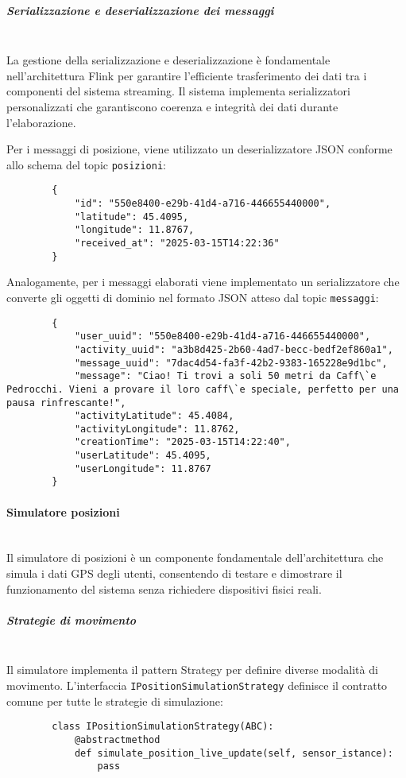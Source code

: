 \documentclass[10pt]{article}
\newcommand{\myparagraph}[1]{\paragraph{#1}\mbox{}\\}
\newcommand{\mysubparagraph}[1]{\subparagraph{#1}\mbox{}\\}
\begin{document}
        \mysubparagraph{Serializzazione e deserializzazione dei messaggi}
        La gestione della serializzazione e deserializzazione è fondamentale nell'architettura Flink per garantire l'efficiente trasferimento dei dati tra i componenti del sistema streaming. Il sistema implementa serializzatori personalizzati che garantiscono coerenza e integrità dei dati durante l'elaborazione.
        
        Per i messaggi di posizione, viene utilizzato un deserializzatore JSON conforme allo schema del topic \texttt{posizioni}:
        \begin{lstlisting}
        {
            "id": "550e8400-e29b-41d4-a716-446655440000",
            "latitude": 45.4095,
            "longitude": 11.8767,
            "received_at": "2025-03-15T14:22:36"
        }
        \end{lstlisting}
        
        Analogamente, per i messaggi elaborati viene implementato un serializzatore che converte gli oggetti di dominio nel formato JSON atteso dal topic \texttt{messaggi}:
        \begin{lstlisting}
        {
            "user_uuid": "550e8400-e29b-41d4-a716-446655440000",
            "activity_uuid": "a3b8d425-2b60-4ad7-becc-bedf2ef860a1",
            "message_uuid": "7dac4d54-fa3f-42b2-9383-165228e9d1bc",
            "message": "Ciao! Ti trovi a soli 50 metri da Caff\`e Pedrocchi. Vieni a provare il loro caff\`e speciale, perfetto per una pausa rinfrescante!",
            "activityLatitude": 45.4084,
            "activityLongitude": 11.8762,
            "creationTime": "2025-03-15T14:22:40",
            "userLatitude": 45.4095,
            "userLongitude": 11.8767
        }
        \end{lstlisting}
        
        \myparagraph{Simulatore posizioni}
        Il simulatore di posizioni è un componente fondamentale dell'architettura che simula i dati GPS degli utenti, consentendo di testare e dimostrare il funzionamento del sistema senza richiedere dispositivi fisici reali.
        
        \mysubparagraph{Strategie di movimento}
        Il simulatore implementa il pattern Strategy per definire diverse modalità di movimento. L'interfaccia \texttt{IPositionSimulationStrategy} definisce il contratto comune per tutte le strategie di simulazione:
        \begin{lstlisting}
        class IPositionSimulationStrategy(ABC):
            @abstractmethod
            def simulate_position_live_update(self, sensor_istance):
                pass
        \end{lstlisting}
    
\end{document}
